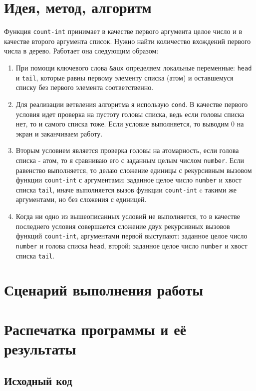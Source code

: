 \documentclass[12pt]{article}
\begin{document}
\section{Идея, метод, алгоритм}
Функция {\tt count-int} принимает в качестве первого аргумента целое число и в качестве второго аргумента список. Нужно найти количество вхождений первого числа в дерево. Работает она следующим образом:
\begin{enumerate}
\setlength{\itemsep}{-1mm} %
\item При помощи ключевого слова {\tt \&aux} определяем локальные переменные: {\tt head} и {\tt tail}, которые равны первому элементу списка (атом) и оставшемуся списку без первого элемента соответственно. 
\item Для реализации ветвления алгоритма я использую {\tt cond}. В качестве первого условия идет проверка на пустоту головы списка, ведь если головы списка нет, то и самого списка тоже. Если условие выполняется, то выводим 0 на экран и заканчиваем работу.
\item Вторым условием является проверка головы на атомарность, если голова списка - атом, то я сравниваю его с заданным целым числом {\tt number}. Если равенство выполняется, то делаю сложение единицы с рекурсивным вызовом функции {\tt count-int} с аргументами: заданное целое число {\tt number} и хвост списка {\tt tail}, иначе выполняется вызов функции {\tt count-int} c такими же аргументами, но без сложения с единицей.
\item Когда ни одно из вышеописанных условий не выполняется, то в качестве последнего условия совершается сложение двух рекурсивных вызовов функций {\tt count-int}, аргументами первой выступают: заданное целое число {\tt number} и голова списка {\tt head}, второй: заданное целое число {\tt number} и хвост списка {\tt tail}.
\end{enumerate}

\section{Сценарий выполнения работы}

\section{Распечатка программы и её результаты}

\subsection{Исходный код}

\end{document}
